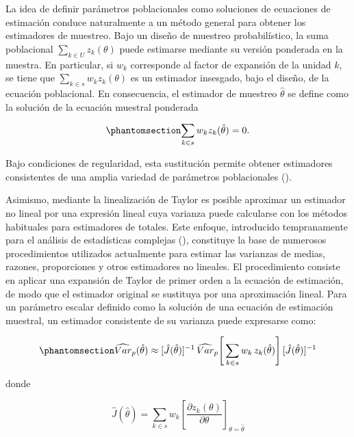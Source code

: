 \documentclass[
  spanish,
  11pt,
  letterpaper,
  oneside,
  open=any]{scrbook}
\begin{document}
La idea de definir parámetros poblacionales como soluciones de
ecuaciones de estimación conduce naturalmente a un método general para
obtener los estimadores de muestreo. Bajo un diseño de muestreo
probabilístico, la suma poblacional \(\sum_{k\in U} z_k(\theta)\) puede
estimarse mediante su versión ponderada en la muestra. En particular, si
\(w_k\) corresponde al factor de expansión de la unidad \(k\), se tiene
que \(\sum_{k\in s}w_k z_k(\theta)\) es un estimador insesgado, bajo el
diseño, de la ecuación poblacional. En consecuencia, el estimador de
muestreo \(\hat{\theta}\) se define como la solución de la ecuación
muestral ponderada

\begin{equation}\protect\phantomsection\label{eq-ecuacion-estimacion-ponderada}{
\sum_{k\in s}w_k z_k(\hat{\theta})=0.
}\end{equation}

Bajo condiciones de regularidad, esta sustitución permite obtener
estimadores consistentes de una amplia variedad de parámetros
poblacionales ().

Asimismo, mediante la linealización de Taylor es posible aproximar un
estimador no lineal por una expresión lineal cuya varianza puede
calcularse con los métodos habituales para estimadores de totales. Este
enfoque, introducido tempranamente para el análisis de estadísticas
complejas (), constituye la
base de numerosos procedimientos utilizados actualmente para estimar las
varianzas de medias, razones, proporciones y otros estimadores no
lineales. El procedimiento consiste en aplicar una expansión de Taylor
de primer orden a la ecuación de estimación, de modo que el estimador
original se sustituya por una aproximación lineal. Para un parámetro
escalar definido como la solución de una ecuación de estimación
muestral, un estimador consistente de su varianza puede expresarse como:

\begin{equation}\protect\phantomsection\label{eq-EcuZ}{
\widehat{Var}_p(\hat{\theta}) \approx [\hat{J}(\hat{\theta})]^{-1} \, \widehat{Var}_p \Bigg[\sum_{k\in s} w_k\, z_k(\hat{\theta})\Bigg] \, [\hat{J}(\hat{\theta})]^{-1}
}\end{equation}

donde

\[
\hat{J}(\hat{\theta}) = \sum_{k\in s} w_k \left[ \frac{\partial z_k(\theta)}{\partial \theta} \right]_{\theta=\hat{\theta}}
\]
\end{document}
